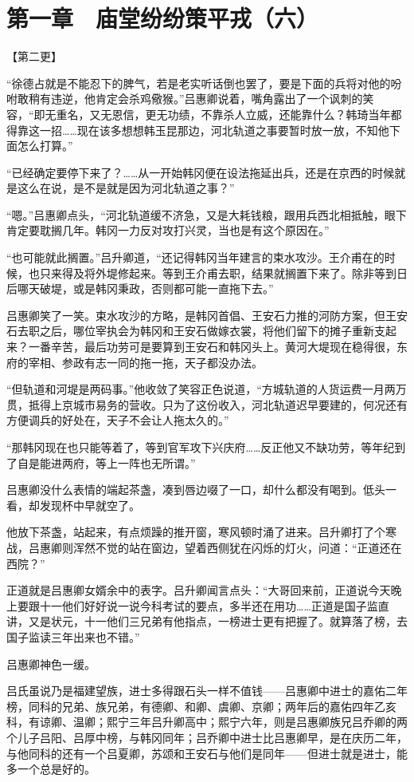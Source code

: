 \section{第一章　庙堂纷纷策平戎（六）}

【第二更】

“徐德占就是不能忍下的脾气，若是老实听话倒也罢了，要是下面的兵将对他的吩咐敢稍有违逆，他肯定会杀鸡儆猴。”吕惠卿说着，嘴角露出了一个讽刺的笑容，“即无重名，又无恩信，更无功绩，不靠杀人立威，还能靠什么？韩琦当年都得靠这一招……现在该多想想韩玉昆那边，河北轨道之事要暂时放一放，不知他下面怎么打算。”

“已经确定要停下来了？……从一开始韩冈便在设法拖延出兵，还是在京西的时候就是这么在说，是不是就是因为河北轨道之事？”

“嗯。”吕惠卿点头，“河北轨道缓不济急，又是大耗钱粮，跟用兵西北相抵触，眼下肯定要耽搁几年。韩冈一力反对攻打兴灵，当也是有这个原因在。”

“也可能就此搁置。”吕升卿道，“还记得韩冈当年建言的束水攻沙。王介甫在的时候，也只来得及将外堤修起来。等到王介甫去职，结果就搁置下来了。除非等到日后哪天破堤，或是韩冈秉政，否则都可能一直拖下去。”

吕惠卿笑了一笑。束水攻沙的方略，是韩冈首倡、王安石力推的河防方案，但王安石去职之后，哪位宰执会为韩冈和王安石做嫁衣裳，将他们留下的摊子重新支起来？一番辛苦，最后功劳可是要算到王安石和韩冈头上。黄河大堤现在稳得很，东府的宰相、参政有志一同的拖一拖，天子都没办法。

“但轨道和河堤是两码事。”他收敛了笑容正色说道，“方城轨道的人货运费一月两万贯，抵得上京城市易务的营收。只为了这份收入，河北轨道迟早要建的，何况还有方便调兵的好处在，天子不会让人拖太久的。”

“那韩冈现在也只能等着了，等到官军攻下兴庆府……反正他又不缺功劳，等年纪到了自是能进两府，等上一阵也无所谓。”

吕惠卿没什么表情的端起茶盏，凑到唇边啜了一口，却什么都没有喝到。低头一看，却发现杯中早就空了。

他放下茶盏，站起来，有点烦躁的推开窗，寒风顿时涌了进来。吕升卿打了个寒战，吕惠卿则浑然不觉的站在窗边，望着西侧犹在闪烁的灯火，问道：“正道还在西院？”

正道就是吕惠卿女婿余中的表字。吕升卿闻言点头：“大哥回来前，正道说今天晚上要跟十一他们好好说一说今科考试的要点，多半还在用功……正道是国子监直讲，又是状元，十一他们三兄弟有他指点，一榜进士更有把握了。就算落了榜，去国子监读三年出来也不错。”

吕惠卿神色一缓。

吕氏虽说乃是福建望族，进士多得跟石头一样不值钱——吕惠卿中进士的嘉佑二年榜，同科的兄弟、族兄弟，有德卿、和卿、虞卿、京卿；两年后的嘉佑四年乙亥科，有谅卿、温卿；熙宁三年吕升卿高中；熙宁六年，则是吕惠卿族兄吕乔卿的两个儿子吕阳、吕厚中榜，与韩冈同年；吕乔卿中进士比吕惠卿早，是在庆历二年，与他同科的还有一个吕夏卿，苏颂和王安石与他们是同年——但进士就是进士，能多一个总是好的。

